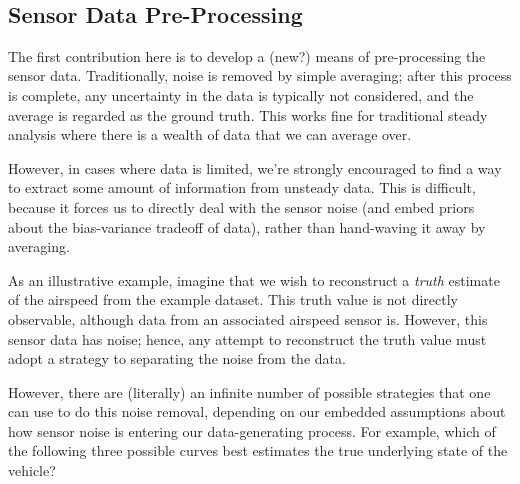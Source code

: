 \documentclass[11pt]{article}
\begin{document}
    \begin{center}
    \end{center}
    { \hspace*{\fill} \\}
    
    \hypertarget{sensor-data-pre-processing}{%
\subsection{Sensor Data
Pre-Processing}\label{sensor-data-pre-processing}}

    The first contribution here is to develop a (new?) means of
pre-processing the sensor data. Traditionally, noise is removed by
simple averaging; after this process is complete, any uncertainty in the
data is typically not considered, and the average is regarded as the
ground truth. This works fine for traditional steady analysis where
there is a wealth of data that we can average over.

However, in cases where data is limited, we're strongly encouraged to
find a way to extract some amount of information from unsteady data.
This is difficult, because it forces us to directly deal with the sensor
noise (and embed priors about the bias-variance tradeoff of data),
rather than hand-waving it away by averaging.

As an illustrative example, imagine that we wish to reconstruct a
\emph{truth} estimate of the airspeed from the example dataset. This
truth value is not directly observable, although data from an associated
airspeed sensor is. However, this sensor data has noise; hence, any
attempt to reconstruct the truth value must adopt a strategy to
separating the noise from the data.

However, there are (literally) an infinite number of possible strategies
that one can use to do this noise removal, depending on our embedded
assumptions about how sensor noise is entering our data-generating
process. For example, which of the following three possible curves best
estimates the true underlying state of the vehicle?
\end{document}
